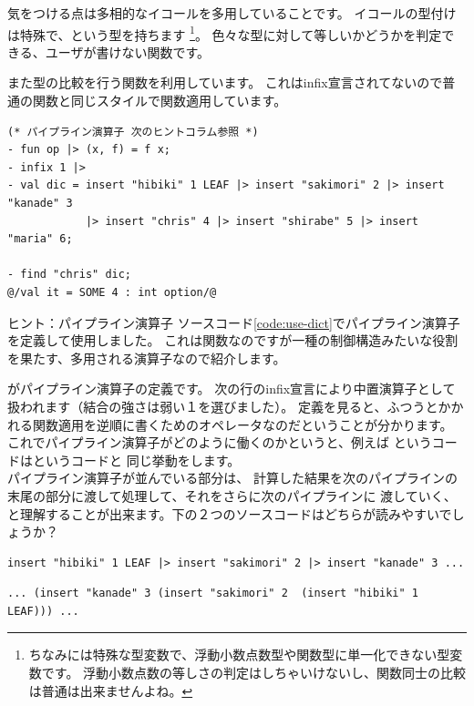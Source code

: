 \documentclass[11pt,a4paper]{jarticle}
\begin{document}
気をつける点は多相的なイコールを多用していることです。
イコールの型付けは特殊で、という型を持ちます
\footnote{ちなみには特殊な型変数で、浮動小数点数型や関数型に単一化できない型変数です。
浮動小数点数の等しさの判定はしちゃいけないし、関数同士の比較は普通は出来ませんよね。}。
色々な型に対して等しいかどうかを判定できる、ユーザが書けない関数です。


また型の比較を行う関数を利用しています。
これはinfix宣言されてないので普通の関数と同じスタイルで関数適用しています。

\begin{lstlisting}[caption=dict型の利用,label=code:use-dict]
(* パイプライン演算子 次のヒントコラム参照 *)
- fun op |> (x, f) = f x;
- infix 1 |>
- val dic = insert "hibiki" 1 LEAF |> insert "sakimori" 2 |> insert "kanade" 3
            |> insert "chris" 4 |> insert "shirabe" 5 |> insert "maria" 6;

- find "chris" dic;
@/val it = SOME 4 : int option/@
\end{lstlisting}

\begin{itembox}[l]{ヒント：パイプライン演算子}
ソースコード\ref{code:use-dict}でパイプライン演算子を定義して使用しました。
これは関数なのですが一種の制御構造みたいな役割を果たす、多用される演算子なので紹介します。

がパイプライン演算子\prog{|>}の定義です。
次の行のinfix宣言により中置演算子として扱われます（結合の強さは弱い１を選びました）。
定義を見ると、ふつうとかかれる関数適用を逆順に書くためのオペレータなのだということが分かります。
これでパイプライン演算子がどのように働くのかというと、例えば
というコードはというコードと
同じ挙動をします。\\
パイプライン演算子が並んでいる部分は、
計算した結果を次のパイプラインの末尾の部分に渡して処理して、それをさらに次のパイプラインに
渡していく、と理解することが出来ます。下の２つのソースコードはどちらが読みやすいでしょうか？

\begin{lstlisting}
insert "hibiki" 1 LEAF |> insert "sakimori" 2 |> insert "kanade" 3 ...
\end{lstlisting}

\begin{lstlisting}
... (insert "kanade" 3 (insert "sakimori" 2  (insert "hibiki" 1 LEAF))) ...
\end{lstlisting}

\end{itembox}
\end{document}
